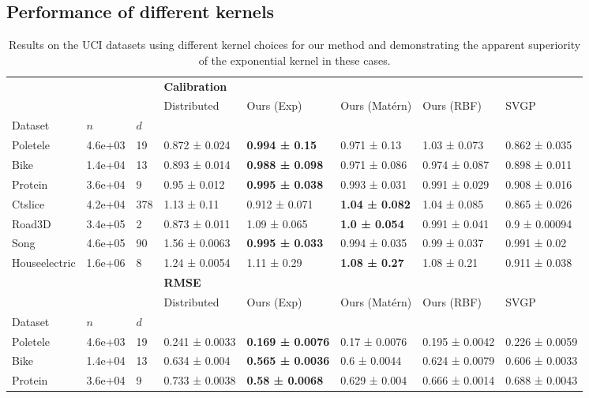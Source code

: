 \subsection{Performance of different kernels}
\begin{table}[ht]\scriptsize
\caption{Results on the UCI datasets using different kernel choices for our method and demonstrating the apparent superiority of the exponential kernel in these cases.}
\label{tab:best_kernels}
\begin{tabularx}{\textwidth}{llllllll}
\toprule
 &  &  & \multicolumn{5}{l}{\textbf{Calibration}} \\
 &  &  & Distributed & Ours (Exp) & Ours (Matérn) & Ours (RBF) & SVGP \\
Dataset & \(n\) & \(d\) &  &  &  &  &  \\
\midrule
Poletele & 4.6e+03 & 19 & 0.872 ± 0.024 & \bfseries 0.994 ± 0.15 & 0.971 ± 0.13 & 1.03 ± 0.073 & 0.862 ± 0.035 \\
Bike & 1.4e+04 & 13 & 0.893 ± 0.014 & \bfseries 0.988 ± 0.098 & 0.971 ± 0.086 & 0.974 ± 0.087 & 0.898 ± 0.011 \\
Protein & 3.6e+04 & 9 & 0.95 ± 0.012 & \bfseries 0.995 ± 0.038 & 0.993 ± 0.031 & 0.991 ± 0.029 & 0.908 ± 0.016 \\
Ctslice & 4.2e+04 & 378 & 1.13 ± 0.11 & 0.912 ± 0.071 & \bfseries 1.04 ± 0.082 & 1.04 ± 0.085 & 0.865 ± 0.026 \\
Road3D & 3.4e+05 & 2 & 0.873 ± 0.011 & 1.09 ± 0.065 & \bfseries 1.0 ± 0.054 & 0.991 ± 0.041 & 0.9 ± 0.00094 \\
Song & 4.6e+05 & 90 & 1.56 ± 0.0063 & \bfseries 0.995 ± 0.033 & 0.994 ± 0.035 & 0.99 ± 0.037 & 0.991 ± 0.02 \\
Houseelectric & 1.6e+06 & 8 & 1.24 ± 0.0054 & 1.11 ± 0.29 & \bfseries 1.08 ± 0.27 & 1.08 ± 0.21 & 0.911 ± 0.038 \\
\bottomrule
\toprule
 &  &  & \multicolumn{5}{l}{\textbf{RMSE}} \\
 &  &  & Distributed & Ours (Exp) & Ours (Matérn) & Ours (RBF) & SVGP \\
Dataset & \(n\) & \(d\) &  &  &  &  &  \\
\midrule
Poletele & 4.6e+03 & 19 & 0.241 ± 0.0033 & \bfseries 0.169 ± 0.0076 & 0.17 ± 0.0076 & 0.195 ± 0.0042 & 0.226 ± 0.0059 \\
Bike & 1.4e+04 & 13 & 0.634 ± 0.004 & \bfseries 0.565 ± 0.0036 & 0.6 ± 0.0044 & 0.624 ± 0.0079 & 0.606 ± 0.0033 \\
Protein & 3.6e+04 & 9 & 0.733 ± 0.0038 & \bfseries 0.58 ± 0.0068 & 0.629 ± 0.004 & 0.666 ± 0.0014 & 0.688 ± 0.0043 \\

\end{tabularx}
\end{table}
